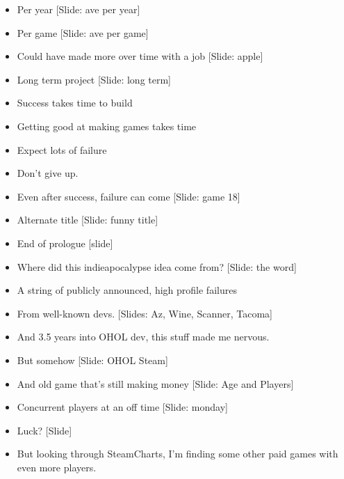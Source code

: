\documentclass[12pt]{article}
\begin{document}
{\begin{itemize}
\item Per year [Slide:  ave per year]

\item Per game [Slide:  ave per game]

\item Could have made more over time with a job [Slide:  apple]

\item Long term project [Slide: long term]

\item Success takes time to build

\item Getting good at making games takes time

\item  Expect lots of failure

\item Don't give up.

\item Even after success, failure can come [Slide: game 18]

\item Alternate title [Slide: funny title]

\item End of prologue [slide]

\item Where did this indieapocalypse idea come from? [Slide: the word]

\item A string of publicly announced, high profile failures

\item From well-known devs.  [Slides:  Az, Wine, Scanner, Tacoma]

\item And 3.5 years into OHOL dev, this stuff made me nervous.

\item But somehow [Slide:  OHOL Steam]

\item And old game that's still making money [Slide:  Age and Players]

\item Concurrent players at an off time [Slide: monday]

\item Luck?  [Slide]

\item But looking through SteamCharts, I'm finding some other paid games with even more players.


\end{itemize}}
\end{document}
